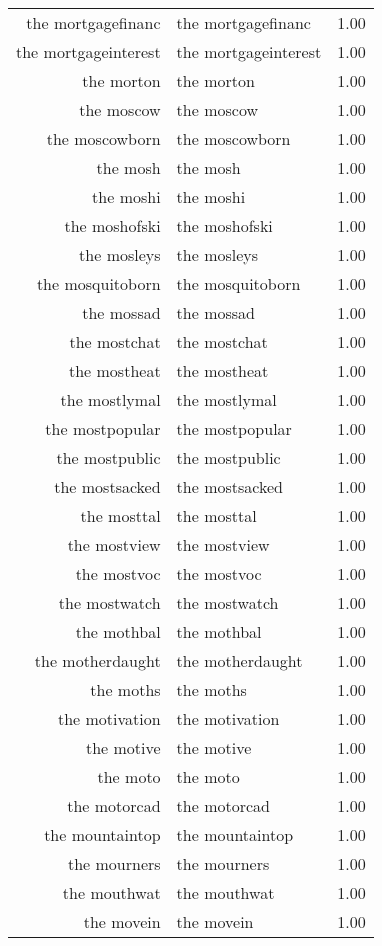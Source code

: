 \begin{table}[ht]
\begin{tabular}{rlr}
  the mortgagefinanc & the mortgagefinanc & 1.00 \\ 
  the mortgageinterest & the mortgageinterest & 1.00 \\ 
  the morton & the morton & 1.00 \\ 
  the moscow & the moscow & 1.00 \\ 
  the moscowborn & the moscowborn & 1.00 \\ 
  the mosh & the mosh & 1.00 \\ 
  the moshi & the moshi & 1.00 \\ 
  the moshofski & the moshofski & 1.00 \\ 
  the mosleys & the mosleys & 1.00 \\ 
  the mosquitoborn & the mosquitoborn & 1.00 \\ 
  the mossad & the mossad & 1.00 \\ 
  the mostchat & the mostchat & 1.00 \\ 
  the mostheat & the mostheat & 1.00 \\ 
  the mostlymal & the mostlymal & 1.00 \\ 
  the mostpopular & the mostpopular & 1.00 \\ 
  the mostpublic & the mostpublic & 1.00 \\ 
  the mostsacked & the mostsacked & 1.00 \\ 
  the mosttal & the mosttal & 1.00 \\ 
  the mostview & the mostview & 1.00 \\ 
  the mostvoc & the mostvoc & 1.00 \\ 
  the mostwatch & the mostwatch & 1.00 \\ 
  the mothbal & the mothbal & 1.00 \\ 
  the motherdaught & the motherdaught & 1.00 \\ 
  the moths & the moths & 1.00 \\ 
  the motivation & the motivation & 1.00 \\ 
  the motive & the motive & 1.00 \\ 
  the moto & the moto & 1.00 \\ 
  the motorcad & the motorcad & 1.00 \\ 
  the mountaintop & the mountaintop & 1.00 \\ 
  the mourners & the mourners & 1.00 \\ 
  the mouthwat & the mouthwat & 1.00 \\ 
  the movein & the movein & 1.00 \\ 

\end{tabular}
\end{table}
